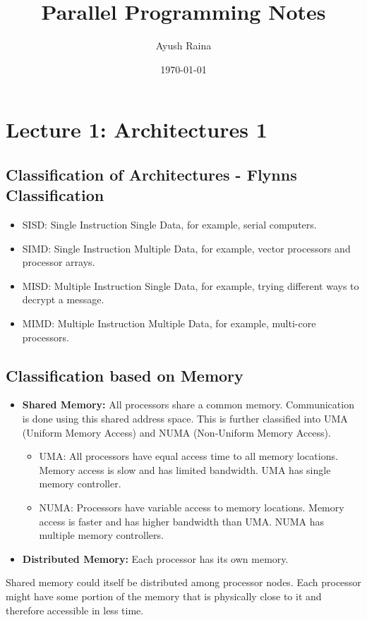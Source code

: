 \documentclass{article}
\title{Parallel Programming Notes}
\author{Ayush Raina}
\date{\today}
\begin{document}
\maketitle

\section*{Lecture 1: Architectures 1}
\subsection*{Classification of Architectures - Flynns Classification}
\begin{itemize}
    \item SISD: Single Instruction Single Data, for example, serial computers.
    \item SIMD: Single Instruction Multiple Data, for example, vector processors and processor arrays.
    \item MISD: Multiple Instruction Single Data, for example, trying different ways to decrypt a message.
    \item MIMD: Multiple Instruction Multiple Data, for example, multi-core processors.
\end{itemize}

\subsection*{Classification based on Memory}
\begin{itemize}
    \item \textbf{Shared Memory:} All processors share a common memory. Communication is done using this shared address space. This is further classified into UMA (Uniform Memory Access) and NUMA (Non-Uniform Memory Access).
    \begin{itemize}
        \item UMA: All processors have equal access time to all memory locations. Memory access is slow and has limited bandwidth. UMA has single memory controller.
        \item NUMA: Processors have variable access to memory locations. Memory access is faster and has higher bandwidth than UMA. NUMA has multiple memory controllers.
    \end{itemize}
    \item \textbf{Distributed Memory:} Each processor has its own memory. 
\end{itemize}

Shared memory could itself be distributed among processor nodes. Each processor might have some portion of the memory that is physically close to it and therefore accessible in less time.
\end{document}

